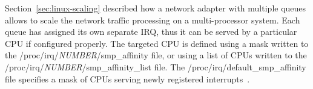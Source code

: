 Section~\ref{sec:linux-scaling} described how a network adapter with multiple queues
allows to scale the network traffic processing on a multi-processor system.
Each queue has assigned its own separate IRQ, thus it can be served by a particular CPU if configured properly.
The targeted CPU is defined using a mask written to the /proc/irq/{\it{NUMBER}}/smp\_affinity file,
or using a list of CPUs written to the /proc/irq/{\it{NUMBER}}/smp\_affinity\_list file.
The /proc/irq/default\_smp\_affinity file specifies a mask of CPUs serving newly registered interrupts~\cite{kernel-doc-irq-affinity}.
